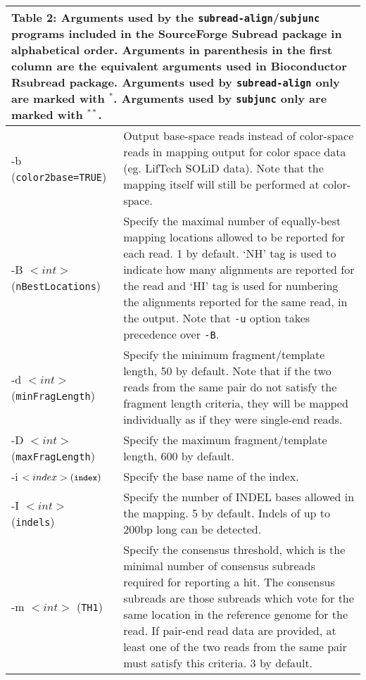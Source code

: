 \documentclass[12pt]{report}
\newcommand{\code}[1]{{\small\texttt{#1}}}
\newcommand{\Subread}{\textsf{Subread}}
\newcommand{\Rsubread}{\textsf{Rsubread}}
\begin{document}
\begin{longtable}{|p{4cm}|p{12cm}|}
\multicolumn{2}{p{16cm}}{Table 2: Arguments used by the \code{subread-align}/\code{subjunc} programs included in the SourceForge {\Subread} package in alphabetical order.
Arguments in parenthesis in the first column are the equivalent arguments used in Bioconductor {\Rsubread} package.
Arguments used by \code{subread-align} only are marked with $^*$.
Arguments used by \code{subjunc} only are marked with $^{**}$.
\newline
}
\endfirsthead
\hline
Arguments & Description \\
\hline
-b \newline (\code{color2base=TRUE}) & Output base-space reads instead of color-space reads in mapping output for color space data (eg. LifTech SOLiD data). Note that the mapping itself will still be performed at color-space.\\
\hline
-B $<int>$ \newline (\code{nBestLocations}) & Specify the maximal number of equally-best mapping locations allowed to be reported for each read. 1 by default. `NH' tag is used to indicate how many alignments are reported for the read and `HI' tag is used for numbering the alignments reported for the same read, in the output. Note that \code{-u} option takes precedence over \code{-B}.\\
\hline
-d $<int>$ \newline (\code{minFragLength}) & Specify the minimum fragment/template length, 50 by default.  Note that if the two reads from the same pair do not satisfy the fragment length criteria, they will be mapped individually as if they were single-end reads.\\
\hline
-D $<int>$ \newline (\code{maxFragLength}) & Specify the maximum fragment/template length, 600 by default.\\
\hline
-i $<index> \newline (\code{index}) $ & Specify the base name of the index.\\
\hline
-I $<int>$ \newline (\code{indels}) & Specify the number of INDEL bases allowed in the mapping. 5 by default. Indels of up to 200bp long can be detected.\\
\hline
-m  $<int>$ \newline (\code{TH1}) & Specify the consensus threshold, which is the minimal number of consensus subreads required for reporting a hit. The consensus subreads are those subreads which vote for the same location in the reference genome for the read. If pair-end read data are provided, at least one of the two reads from the same pair must satisfy this criteria. 3 by default.\\

\end{longtable}
\end{document}
